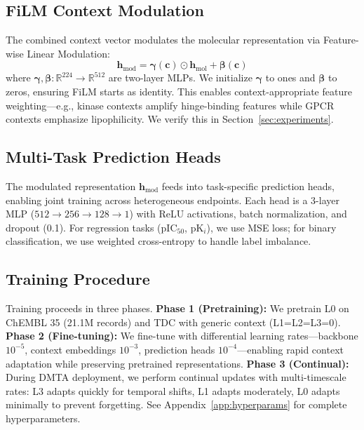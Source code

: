 \documentclass{article}
\newcommand{\hmol}{\mathbf{h}_{\text{mol}}}
\newcommand{\hmod}{\mathbf{h}_{\text{mod}}}
\begin{document}
\subsection{FiLM Context Modulation}

The combined context vector modulates the molecular representation via Feature-wise Linear Modulation:
\begin{equation}
    \hmod = \boldsymbol{\gamma}(\mathbf{c}) \odot \hmol + \boldsymbol{\beta}(\mathbf{c})
    \label{eq:film}
\end{equation}
where $\boldsymbol{\gamma}, \boldsymbol{\beta}: \mathbb{R}^{224} \rightarrow \mathbb{R}^{512}$ are two-layer MLPs. We initialize $\boldsymbol{\gamma}$ to ones and $\boldsymbol{\beta}$ to zeros, ensuring FiLM starts as identity. This enables context-appropriate feature weighting---e.g., kinase contexts amplify hinge-binding features while GPCR contexts emphasize lipophilicity. We verify this in Section~\ref{sec:experiments}.

\subsection{Multi-Task Prediction Heads}

The modulated representation $\hmod$ feeds into task-specific prediction heads, enabling joint training across heterogeneous endpoints. Each head is a 3-layer MLP ($512 \rightarrow 256 \rightarrow 128 \rightarrow 1$) with ReLU activations, batch normalization, and dropout (0.1). For regression tasks (pIC$_{50}$, pK$_i$), we use MSE loss; for binary classification, we use weighted cross-entropy to handle label imbalance.

\subsection{Training Procedure}

Training proceeds in three phases. \textbf{Phase 1 (Pretraining):} We pretrain L0 on ChEMBL 35 \citep{zdrazil_2024_chembl} (21.1M records) and TDC \citep{huang_2021_tdc} with generic context (L1=L2=L3=0). \textbf{Phase 2 (Fine-tuning):} We fine-tune with differential learning rates---backbone $10^{-5}$, context embeddings $10^{-3}$, prediction heads $10^{-4}$---enabling rapid context adaptation while preserving pretrained representations. \textbf{Phase 3 (Continual):} During DMTA deployment, we perform continual updates with multi-timescale rates: L3 adapts quickly for temporal shifts, L1 adapts moderately, L0 adapts minimally to prevent forgetting. See Appendix~\ref{app:hyperparams} for complete hyperparameters.
\end{document}
